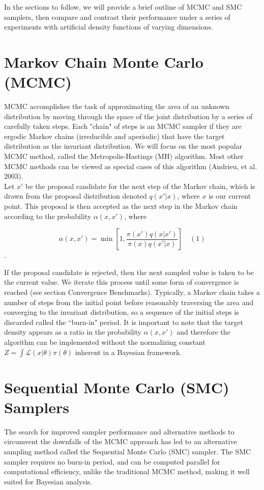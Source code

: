 \documentclass[12pt]{elsarticle}
\begin{document}
In the sections to follow, we will provide a brief outline of MCMC and SMC samplers, then compare and contrast their performance under a series of experiments with artificial density functions of varying dimensions.

\section*{Markov Chain Monte Carlo (MCMC)}
MCMC accomplishes the task of approximating the area of an unknown distribution by moving through the space of the joint distribution by a series of carefully taken steps. Each "chain" of steps is an MCMC sampler if they are ergodic Markov chains (irreducible and aperiodic) that have the target distribution as the invariant distribution.  We will focus on the most popular MCMC method, called the Metropolis-Hastings (MH) algorithm. Most other MCMC methods can be viewed as special cases of this algorithm (Andrieu, et al. 2003). \\

Let $x'$ be the proposal candidate for the next step of the Markov chain, which is drawn from the proposal distribution denoted $q(x'|x)$, where $x$ is our current point. This proposal is then accepted as the next step in the Markov chain according to the probability $\alpha(x,x')$, where 

\[
\alpha(x,x') = \min{\left[1, \frac{\pi(x') q(x|x')}{\pi(x)q(x'|x)}\right]} \quad (1)
\].

If the proposal candidate is rejected, then the next sampled value is taken to be the current value. We iterate this process until some form of convergence is reached (see section Convergence Benchmarks). Typically, a Markov chain takes a number of steps from the initial point before reasonably traversing the area and converging to the invariant distribution, so a sequence of the initial steps is discarded called the ``burn-in" period. It is important to note that the target density appears as a ratio in the probability $ \alpha(x,x')$ and therefore the algorithm can be implemented without the normalizing constant $Z = \int \mathcal{L}(x|\theta)\pi(\theta)$ inherent in a Bayesian framework.

\section*{Sequential Monte Carlo (SMC) Samplers}
The search for improved sampler performance and alternative methods to circumvent the downfalls of the MCMC approach has led to an alternative sampling method called the Sequential Monte Carlo (SMC) sampler. The SMC sampler requires no burn-in period, and can be computed parallel for computational efficiency, unlike the traditional MCMC method, making it well suited for Bayesian analysis. \\
\end{document}
